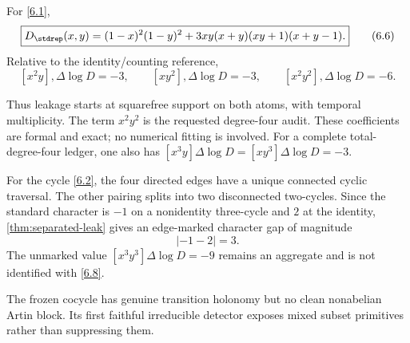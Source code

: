 \begin{theorem}
\label{thm:standard-block}
For \eqref{6.1},
\[
\boxed{
D_{\stdrep}(x,y)
=(1-x)^2(1-y)^2
+3xy(x+y)(xy+1)(x+y-1).}
\tag{6.6}\label{6.6}
\]
Relative to the identity/counting reference,
\[
[x^2y],\Delta\log D=-3,\qquad
[xy^2],\Delta\log D=-3,\qquad
[x^2y^2],\Delta\log D=-6.
\tag{6.7}\label{6.7}
\]
\end{theorem}

Thus leakage starts at squarefree support on both atoms, with temporal
multiplicity.  The term $x^2y^2$ is the requested degree-four audit.  These
coefficients are formal and exact; no numerical fitting is involved.  For a
complete total-degree-four ledger, one also has
$[x^3y]\Delta\log D=[xy^3]\Delta\log D=-3$.

For the cycle \eqref{6.2}, the four directed edges have a unique connected
cyclic traversal.  The other pairing splits into two disconnected
two-cycles.  Since the standard character is $-1$ on a nonidentity
three-cycle and $2$ at the identity, \cref{thm:separated-leak} gives an
edge-marked character gap of magnitude
\[
 |{-1}-2|=3.
\tag{6.8}\label{6.8}
\]
The unmarked value $[x^3y^3]\Delta\log D=-9$ remains an aggregate and is not
identified with \eqref{6.8}.

\begin{corollary}
\label{cor:noncomm-no-go}
The frozen cocycle has genuine transition holonomy but no clean nonabelian
Artin block.  Its first faithful irreducible detector exposes mixed subset
primitives rather than suppressing them.
\end{corollary}
